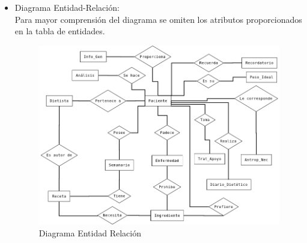 \begin{itemize}
\newpage
\item Diagrama Entidad-Relación:\\
Para mayor comprensión del diagrama se omiten los atributos proporcionados en la tabla de entidades.
\begin{figure}[H]
  \label{d_er}
  \begin{center}
    \includegraphics[scale=0.6]{../img/Diagrama_ER.png}
  \end{center}
  \caption{Diagrama Entidad Relación}
\end{figure}
\end{itemize}
\newpage
